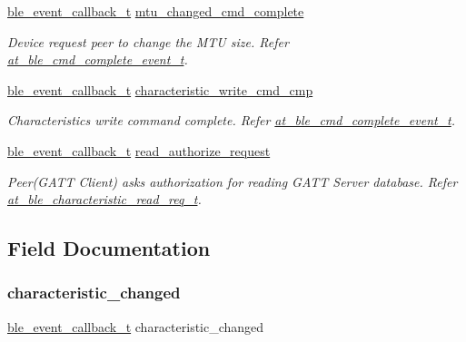\begin{DoxyCompactItemize}
\mbox{\hyperlink{ble__manager_8h_a04ce4bb8cb8282f2762e3924b1773cc9}{ble\+\_\+event\+\_\+callback\+\_\+t}} \mbox{\hyperlink{structble__gatt__server__event__cb_a0e2ca473ce2221274e8ce05a48233d49}{mtu\+\_\+changed\+\_\+cmd\+\_\+complete}}
\begin{DoxyCompactList}\small\item\em Device request peer to change the M\+TU size. Refer \mbox{\hyperlink{structat__ble__cmd__complete__event__t}{at\+\_\+ble\+\_\+cmd\+\_\+complete\+\_\+event\+\_\+t}}. \end{DoxyCompactList}\item 
\mbox{\hyperlink{ble__manager_8h_a04ce4bb8cb8282f2762e3924b1773cc9}{ble\+\_\+event\+\_\+callback\+\_\+t}} \mbox{\hyperlink{structble__gatt__server__event__cb_a22defb4fe6f795a56b10cb020dfa4272}{characteristic\+\_\+write\+\_\+cmd\+\_\+cmp}}
\begin{DoxyCompactList}\small\item\em Characteristics write command complete. Refer \mbox{\hyperlink{structat__ble__cmd__complete__event__t}{at\+\_\+ble\+\_\+cmd\+\_\+complete\+\_\+event\+\_\+t}}. \end{DoxyCompactList}\item 
\mbox{\hyperlink{ble__manager_8h_a04ce4bb8cb8282f2762e3924b1773cc9}{ble\+\_\+event\+\_\+callback\+\_\+t}} \mbox{\hyperlink{structble__gatt__server__event__cb_a73149ea7b859fbb1183fb8ab5aa3ad79}{read\+\_\+authorize\+\_\+request}}
\begin{DoxyCompactList}\small\item\em Peer(\+G\+A\+T\+T Client) asks authorization for reading G\+A\+TT Server database. Refer \mbox{\hyperlink{structat__ble__characteristic__read__req__t}{at\+\_\+ble\+\_\+characteristic\+\_\+read\+\_\+req\+\_\+t}}. \end{DoxyCompactList}\end{DoxyCompactItemize}


\subsection{Field Documentation}
\mbox{\label{structble__gatt__server__event__cb_a3180cecaaa199e1dd5aecb41f552b4bc}} 
\subsubsection{\texorpdfstring{characteristic\_changed}{characteristic\_changed}}
{\footnotesize\ttfamily \mbox{\hyperlink{ble__manager_8h_a04ce4bb8cb8282f2762e3924b1773cc9}{ble\+\_\+event\+\_\+callback\+\_\+t}} characteristic\+\_\+changed}



